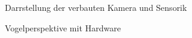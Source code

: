\begin{figure}[h]
    \caption{Darrstellung der verbauten Kamera und Sensorik}\label{fig:kameras_sensorik}
\end{figure}

\begin{figure}[h]
    \caption{Vogelperspektive mit Hardware}\label{fig:hardware}
\end{figure}
